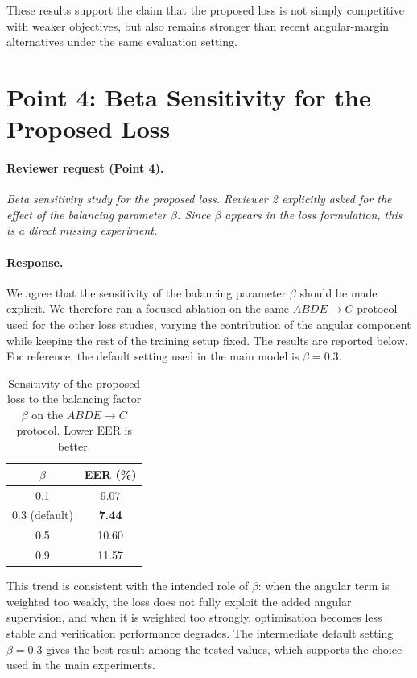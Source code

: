 \documentclass[11pt]{article}
\begin{document}
These results support the claim that the proposed loss is not simply competitive with weaker objectives, but also remains stronger than recent angular-margin alternatives under the same evaluation setting.

\section*{Point 4: Beta Sensitivity for the Proposed Loss}

\paragraph{Reviewer request (Point 4).}
\emph{Beta sensitivity study for the proposed loss. Reviewer 2 explicitly asked for the effect of the balancing parameter $\beta$. Since $\beta$ appears in the loss formulation, this is a direct missing experiment.}

\paragraph{Response.}
We agree that the sensitivity of the balancing parameter $\beta$ should be made explicit. We therefore ran a focused ablation on the same $ABDE \rightarrow C$ protocol used for the other loss studies, varying the contribution of the angular component while keeping the rest of the training setup fixed. The results are reported below. For reference, the default setting used in the main model is $\beta = 0.3$.

\begin{table}[ht!]
    \centering
    \begin{tabular}{|c|c|}
        \hline
        $\beta$ & EER (\%) \\
        \hline
        0.1 & 9.07 \\
        0.3 (default) & \textbf{7.44} \\
        0.5 & 10.60 \\
        0.9 & 11.57 \\
        \hline
    \end{tabular}
    \caption{Sensitivity of the proposed loss to the balancing factor $\beta$ on the $ABDE \rightarrow C$ protocol. Lower EER is better.}
    \label{tab:rebuttal_beta_ablation}
\end{table}

This trend is consistent with the intended role of $\beta$: when the angular term is weighted too weakly, the loss does not fully exploit the added angular supervision, and when it is weighted too strongly, optimisation becomes less stable and verification performance degrades. The intermediate default setting $\beta = 0.3$ gives the best result among the tested values, which supports the choice used in the main experiments.
\end{document}
